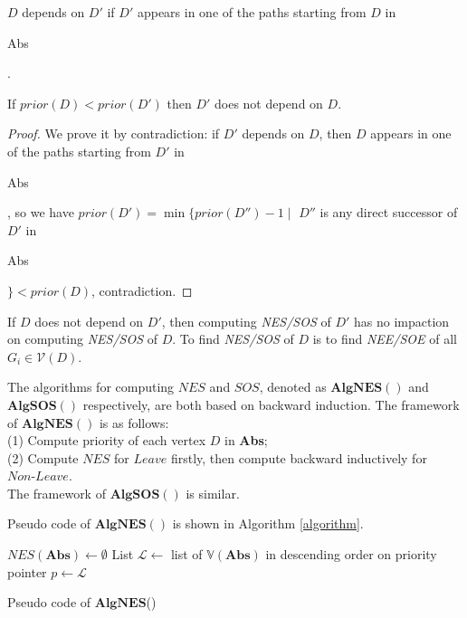 \documentclass{acm_proc_article-sp}
\begin{document}
\begin{definition}
$D$ \textsf{depends on} $D'$ if $D'$ appears in one of the paths starting from $D$ in \begin{bf}Abs\end{bf}.
\end{definition}

\begin{Theorem}
If $prior(D)<prior(D')$ then $D'$ does not depend on $D$.
\end{Theorem}
\begin{proof}
We prove it by contradiction: if $D'$ depends on $D$, then $D$ appears in one of the paths starting from $D'$ in \begin{bf}Abs\end{bf}, so we have $prior(D')=\min\{prior(D'')-1\mid $ $D''$ is any direct successor of $D'$ in \begin{bf}Abs\end{bf}$\} < prior(D)$, contradiction.
\end{proof}

If $D$ does not depend on $D'$, then computing \textit{NES/SOS} of $D'$ has no impaction on computing \textit{NES/SOS} of $D$. To find \textit{NES/SOS} of $D$ is to find \textit{NEE/SOE} of all $G_{\textit{i}}\in \mathcal{V}(D)$.

The algorithms for computing $\textit{NES}$ and $\textit{SOS}$, denoted as $\mathbf{AlgNES}()$ and $\mathbf{AlgSOS}()$ respectively, are both based on backward induction. The framework of $\mathbf{AlgNES}()$ is as follows:\\
(1) Compute priority of each vertex $D$ in \textbf{Abs};\\
(2) Compute $\textit{NES}$ for $\textit{Leave}$ firstly, then compute backward inductively for $\textit{Non-Leave}$.\\
The framework of $\mathbf{AlgSOS}()$ is similar.

Pseudo code of $\mathbf{AlgNES}()$ is shown in Algorithm \ref{algorithm}.

\begin{algorithm}[h]
\scriptsize
 $\textit{NES}(\textbf{Abs})\leftarrow \emptyset$\;
 List $\mathcal{L}\leftarrow$ list of $\mathds{V}(\textbf{Abs})$ in descending order on priority\;
 pointer $p\leftarrow \mathcal{L}$\;
 \caption{Pseudo code of $\mathbf{AlgNES}$()}
 \label{algorithm}
\end{algorithm}
\end{document}
